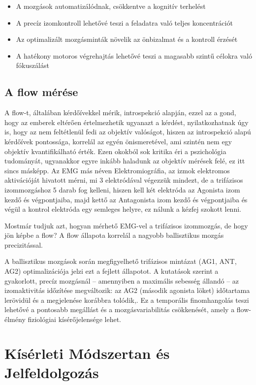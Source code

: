 \begin{itemize}
    \item A mozgások automatizálódnak, csökkentve a kognitív terhelést
    \item A precíz izomkontroll lehetővé teszi a feladatra való teljes koncentrációt
    \item Az optimalizált mozgásminták növelik az önbizalmat és a kontroll érzését
    \item A hatékony motoros végrehajtás lehetővé teszi a magasabb szintű célokra való fókuszálást
\end{itemize}

\subsection{A flow mérése}
A flow-t, általában kérdőívekkel mérik, introspekció alapján, ezzel az a gond, hogy az emberek eltérően értelmezhetik ugyanazt a kérdést, nyilatkozhatnak úgy is, hogy az nem feltétlenül fedi az objektív valóságot, hiszen az introspekció alapú kérdőívek pontossága, korrelál az egyén önismeretével, ami szintén nem egy objektív kvantifikálható érték.\cite{methodological-limitations-of-introspections-in-ageing-studies, The-Introspection-Illusion} Ezen okokból sok kritika éri a pszichológia tudományát, ugyanakkor egyre inkább haladunk az objektív mérések felé, ez itt sincs másképp. Az EMG más néven Elektromiográfia, az izmok elektromos aktivációját hivatott mérni, mi 3 elektródával végezzük mindezt, de a trifázisos izommozgáshoz 5 darab fog kelleni, hiszen kell két elektróda az Agonista izom kezdő és végpontjaiba, majd kettő az Antagonista izom kezdő és végpontjaiba és végül a kontrol elektróda egy semleges helyre, ez nálunk a kézfej szokott lenni.

Mostmár tudjuk azt, hogyan mérhető EMG-vel a trifázisos izommozgás, de hogy jön képbe a flow? A flow állapota korrelál a nagyobb ballisztikus mozgás precizitással.

 A ballisztikus mozgások során megfigyelhető trifázisos mintázat (AG1, ANT, AG2) optimalizációja jelzi ezt a fejlett állapotot. A kutatások szerint a gyakorlott, precíz mozgásnál – amennyiben a maximális sebesség állandó – az izomaktivitás időzítése megváltozik: az AG2 (második agonista löket) időtartama lerövidül és a megjelenése korábbra tolódik,. Ez a temporális finomhangolás teszi lehetővé a pontosabb megállást és a mozgásvariabilitás csökkenését, amely a flow-élmény fiziológiai kísérőjelensége lehet.

 \section{Kísérleti Módszertan és Jelfeldolgozás}

